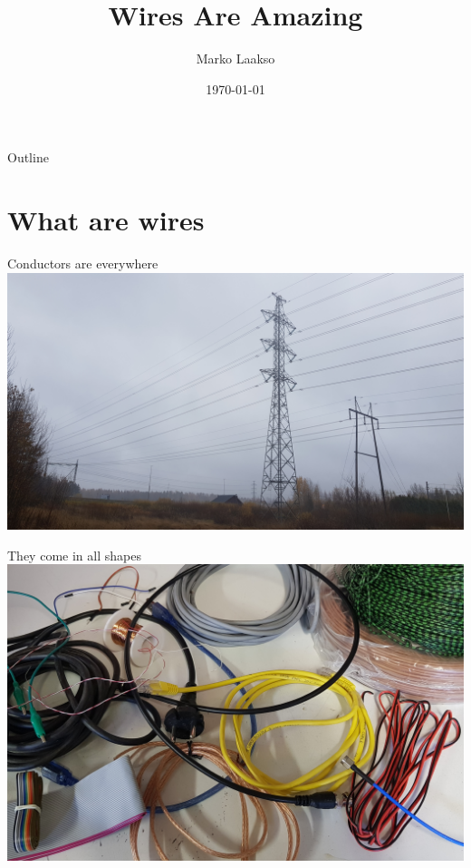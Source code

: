 \documentclass{beamer}
\title{Wires Are Amazing}
\author{Marko Laakso}
\institute{Asser's Lab}
\date{\today}
\begin{document}
\frame{\titlepage}

\begin{frame}{Outline}
    \tableofcontents
\end{frame}

\section{What are wires}

\begin{frame}{Conductors are everywhere}
\centering\includegraphics[keepaspectratio, width=0.94\paperwidth]{powerline_h.jpg}
\end{frame}

\begin{frame}{They come in all shapes}
\centering\includegraphics[keepaspectratio, width=0.88\paperwidth]{wires.jpg}
\end{frame}

\end{document}
